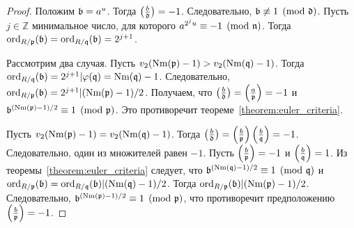 \documentclass[_00_dissertation.tex]{subfiles}
\begin{document}
\begin{proof}
    Положим $\mathfrak{b} = a^u$.
    Тогда $\left(\frac{b}{\mathfrak{d}}\right) = -1$.
    Следовательно, $\mathfrak{b} \not\equiv 1 \pmod{\mathfrak{d}}$.
    Пусть $j \in \mathbb{Z}$ минимальное число, для которого $a^{2^j u} \equiv -1 \pmod{\mathfrak{n}}$.
    Тогда $\textrm{ord}_{R/\mathfrak{p}}(\mathfrak{b}) = \textrm{ord}_{R/\mathfrak{q}}(\mathfrak{b}) = 2^{j+1}$.
    
    Рассмотрим два случая.
    Пусть $v_2(\textrm{Nm}(\mathfrak{p}) - 1) > v_2(\textrm{Nm}(\mathfrak{q}) - 1)$.
    Тогда $\textrm{ord}_{R/\mathfrak{q}}(\mathfrak{b}) = 2^{j+1} | \varphi(\mathfrak{q}) = \textrm{Nm}(\mathfrak{q}) - 1$.
    Следовательно, $\textrm{ord}_{R/\mathfrak{p}}(\mathfrak{b}) = 2^{j+1} | (\textrm{Nm}(\mathfrak{p}) - 1)/2$.
    Получаем, что $\left(\frac{b}{\mathfrak{d}}\right) = \left(\frac{a}{\mathfrak{p}}\right) = -1$ и $\mathfrak{b}^{(\textrm{Nm}(\mathfrak{p}) - 1)/2} \equiv 1 \pmod{\mathfrak{p}}$.
    Это противоречит теореме~\ref{theorem:euler_criteria}.
    
    Пусть $v_2(\textrm{Nm}(\mathfrak{p}) - 1) = v_2(\textrm{Nm}(\mathfrak{q}) - 1)$.
    Тогда $\left(\frac{b}{\mathfrak{d}}\right) = \left(\frac{b}{\mathfrak{p}}\right)\left(\frac{b}{\mathfrak{q}}\right) = -1$.
    Следовательно, один из множителей равен $-1$.
    Пусть $\left(\frac{b}{\mathfrak{p}}\right) = -1$ и $\left(\frac{b}{\mathfrak{q}}\right) = 1$.
    Из теоремы~\ref{theorem:euler_criteria} следует, что $\mathfrak{b}^{(\textrm{Nm}(\mathfrak{q}) - 1)/2} \equiv 1 \pmod{\mathfrak{q}}$ и $\textrm{ord}_{R/\mathfrak{p}}(\mathfrak{b}) = \textrm{ord}_{R/\mathfrak{q}}(\mathfrak{b}) | (\textrm{Nm}(\mathfrak{q}) - 1)/2$.
    Тогда $\textrm{ord}_{R/\mathfrak{p}}(\mathfrak{b}) | (\textrm{Nm}(\mathfrak{p}) - 1)/2$.
    Следовательно, $\mathfrak{b}^{(\textrm{Nm}(\mathfrak{p}) - 1)/2} \equiv 1 \pmod{\mathfrak{p}}$, что противоречит предположению $\left(\frac{b}{\mathfrak{p}}\right) = -1$.
\end{proof}
\end{document}
